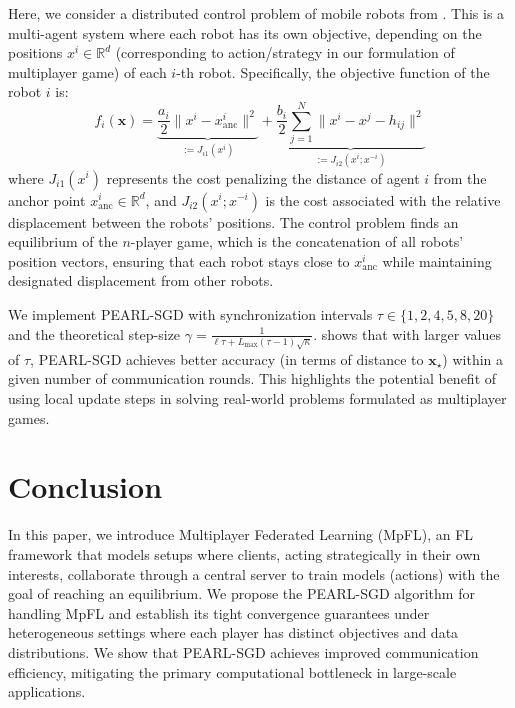 \documentclass{article}
\newcommand{\algname}[1]{{\color{PineGreen}\sf  #1}\xspace}
\newcommand{\vx}{{\mathbf{x}}}
\newcommand{\reals}{\mathbb{R}}
\newcommand{\abbvname}{\algname{PEARL-SGD}}
\theoremstyle{plain}
\theoremstyle{remark}
\begin{document}
Here, we consider a distributed control problem of mobile robots from \citep{KalyvaPsillakis2024_distributed}. 
This is a multi-agent system where each robot has its own objective, depending on the positions $x^i \in \reals^d$ (corresponding to action/strategy in our formulation of multiplayer game) of each $i$-th robot. 
Specifically, the objective function of the robot $i$ is:
\begin{equation}
    f_i(\vx) = \underbrace{\frac{a_i}{2}\| x^i - x^i_\mathrm{anc}\|^2}_{:=J_{i1}(x^i)} + \underbrace{\frac{b_i}{2} \sum_{j = 1}^N \| x^i - x^j - h_{ij}\|^2}_{:=J_{i2}(x^i; x^{-i})}
    \label{eqn:mobile-robot-objectives}
\end{equation}
where $J_{i1}(x^i)$ represents the cost penalizing the distance of agent $i$ from the anchor point $x^i_\mathrm{anc} \in \reals^d$, and $J_{i2}(x^i; x^{-i})$ is the cost associated with the relative displacement between the robots' positions. 
The control problem finds an equilibrium of the $n$-player game, which is the concatenation of all robots' position vectors, ensuring that each robot stays close to $x^i_\mathrm{anc}$ while maintaining designated displacement from other robots. 

We implement \abbvname with synchronization intervals $\tau \in \{ 1, 2, 4, 5, 8, 20 \}$ and the theoretical step-size $\gamma = \frac{1}{\ell \tau + L_{\max}(\tau -1) \sqrt{\kappa}}$. 
 shows that with larger values of $\tau$, \abbvname achieves better accuracy (in terms of distance to $\vx_\star$) within a given number of communication rounds. 
This highlights the potential benefit of using local update steps in solving real-world problems formulated as multiplayer games.

\section{Conclusion}

In this paper, we introduce Multiplayer Federated Learning (MpFL), an FL framework that models setups where clients, acting strategically in their own interests, collaborate through a central server to train models (actions) with the goal of reaching an equilibrium.
We propose the \abbvname algorithm for handling MpFL and establish its tight convergence guarantees under heterogeneous settings where each player has distinct objectives and data distributions. 
We show that \abbvname achieves improved communication efficiency, mitigating the primary computational bottleneck in large-scale applications.
\end{document}
